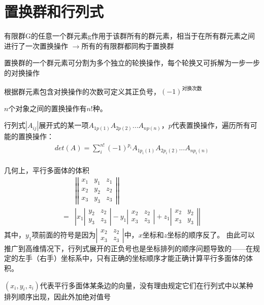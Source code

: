 \section{置换群和行列式}

有限群G的任意一个群元素g作用于该群所有的群元素，相当于在所有群元素之间进行了一次置换操作
$\rightarrow$所有的有限群都同构于置换群

置换群的一个群元素可分割为多个独立的轮换操作，每个轮换又可拆解为一步一步的对换操作

根据群元素包含对换操作的次数可定义其正负号，$(-1)^{\text{对换次数}}$

$n$个对象之间的置换操作有$n!$种。

行列式$|A_{ij}|$展开式的某一项$A_{1p(1)}A_{2p(2)}...A_{np(n)}$，$p$代表置换操作，遍历所有可能的置换操作：
\begin{gather}
    det(A)=\sum_{i}^{n!} (-1)^{p_{i}}A_{1p_{i}(1)}A_{2p_{i}(2)}...A_{np_{i}(n)}
\end{gather}
\\

几何上，平行多面体的体积
\begin{align}
    &\left | \left | \begin{matrix}
        x_{1} &y_{1} & z_{1} \\
        x_{2} &y_{2} & z_{2} \\
        x_{3} &y_{3} & z_{3}
    \end{matrix} \right | \right | \\
    =& \left | x_{1}\left | \begin{matrix} y_{2} & z_{2} \\ y_{3} & z_{3} \end{matrix} \right |
    - y_{1}\left | \begin{matrix} x_{2} & z_{2} \\ x_{3} & z_{3} \end{matrix} \right |
    + z_{1}\left | \begin{matrix} x_{2} & y_{2} \\ x_{3} & y_{3} \end{matrix} \right | \right |
\end{align}
其中，$y_{1}$项前面的符号是因为$\left | \begin{matrix} x_{2} & z_{2} \\ x_{3} & z_{3} \end{matrix} \right |$中，$x$坐标和$z$坐标的顺序反了。
由此可以推广到高维情况下，行列式展开的正负号也是坐标排列的顺序问题导致的——在规定的左手（右手）坐标系中，只有正确的坐标顺序才能正确计算平行多面体的体积。

$(x_{i}, y_{i}, z_{i})$代表平行多面体某条边的向量，没有理由规定它们在行列式中以某种排列顺序出现，因此外加绝对值号
